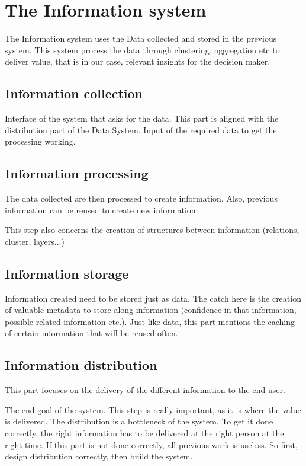 \section{The Information system}
The Information system uses the Data collected and stored in the previous system.
This system process the data through clustering, aggregation etc to deliver value, that is in our case, relevant insights for the decision maker.

\subsection{Information collection}
Interface of the system that asks for the data.
This part is aligned with the distribution part of the Data System.
Input of the required data to get the processing working.

\subsection{Information processing}
The data collected are then processed to create information.
Also, previous information can be reused to create new information.

This step also concerns the creation of structures between information (relations, cluster, layers...)

\subsection{Information storage}
Information created need to be stored just as data.
The catch here is the creation of valuable metadata to store along information (confidence in that information, possible related information etc.).
Just like data, this part mentions the caching of certain information that will be reused often.

\subsection{Information distribution}
This part focuses on the delivery of the different information to the end user.

The end goal of the system.
This step is really important, as it is where the value is delivered.
The distribution is a bottleneck of the system.
To get it done correctly, the right information has to be delivered at the right person at the right time.
If this part is not done correctly, all previous work is useless.
So first, design distribution correctly, then build the system.

